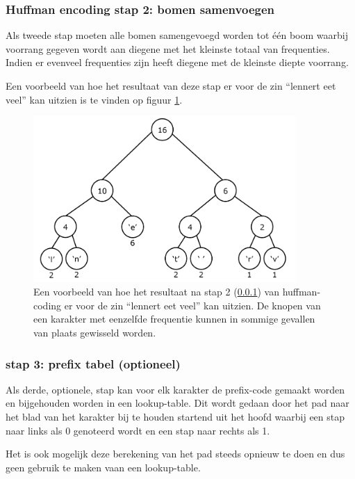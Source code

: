 \subsubsection{Huffman encoding stap 2: bomen samenvoegen}
\label{sec:primitieve-technieken-voorbeeld-huffman-encoding-2}
Als tweede stap moeten alle bomen samengevoegd worden tot één boom waarbij voorrang gegeven wordt aan diegene met het kleinste totaal van frequenties. Indien er evenveel frequenties zijn heeft diegene met de kleinste diepte voorrang.

Een voorbeeld van hoe het resultaat van deze stap er voor de zin “lennert eet veel” kan uitzien is te vinden op figuur \ref{fig:huffman-stap-2}.

\FloatBarrier
\begin{figure}[h!]
	\includegraphics[width=100mm]{img/literatuurstudie/huffman-stap-2.png}
	\caption{Een voorbeeld van hoe het resultaat na stap 2 (\ref{sec:primitieve-technieken-voorbeeld-huffman-encoding-2}) van \gls{huffman-coding} er voor de zin “lennert eet veel” kan uitzien. De knopen van een karakter met eenzelfde frequentie kunnen in sommige gevallen van plaats gewisseld worden.}
	\label{fig:huffman-stap-2}
\end{figure}
\FloatBarrier

\subsubsection{stap 3: prefix tabel (optioneel)}
\label{sec:primitieve-technieken-voorbeeld-huffman-encoding-3}
Als derde, optionele, stap kan voor elk karakter de \gls{prefix-code} gemaakt worden en bijgehouden worden in een \gls{lookup-table}. Dit wordt gedaan door het pad naar het blad van het karakter bij te houden startend uit het hoofd waarbij een stap naar links als 0 genoteerd wordt en een stap naar rechts als 1.

Het is ook mogelijk deze berekening van het pad steeds opnieuw te doen en dus geen gebruik te maken vaan een \gls{lookup-table}.

